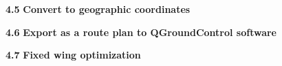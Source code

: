 \documentclass[12pt,a4paper]{article}
\begin{document}



\par\medskip
\noindent\textbf{4.5}\quad
\textbf{Convert to geographic coordinates}



\par\medskip
\noindent\textbf{4.6}\quad
\textbf{Export as a route plan to QGroundControl software}





\par\medskip
\noindent\textbf{4.7}\quad
\textbf{Fixed wing optimization}


\end{document}
